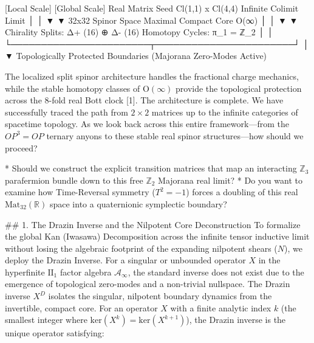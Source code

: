             [Local Scale]                                   [Global Scale]
 Real Matrix Seed Cl(1,1) x Cl(4,4)                  Infinite Colimit Limit
                  │                                               │
                  ▼                                               ▼
         32x32 Spinor Space                         Maximal Compact Core O(∞)
                  │                                               │
                  ▼                                               ▼
  Chirality Splits: Δ+ (16) ⊕ Δ- (16)               Homotopy Cycles: π_1 = ℤ_2
                  │                                               │
                  └───────────────────────┬───────────────────────┘
                                          │
                                          ▼
                         Topologically Protected Boundaries
                            (Majorana Zero-Modes Active)

The localized split spinor architecture handles the fractional charge mechanics, while the stable homotopy classes of $\text{O}(\infty)$ provide the topological protection across the 8-fold real Bott clock [1].
The architecture is complete. We have successfully traced the path from $2 \times 2$ matrices up to the infinite categories of spacetime topology.
As we look back across this entire framework—from the $OP^3 = OP$ ternary anyons to these stable real spinor structures—how should we proceed?

* Should we construct the explicit transition matrices that map an interacting $\mathbb{Z}_3$ parafermion bundle down to this free $\mathbb{Z}_2$ Majorana real limit?
* Do you want to examine how Time-Reversal symmetry ($T^2=-1$) forces a doubling of this real $\text{Mat}_{32}(\mathbb{R})$ space into a quaternionic symplectic boundary?


## 1. The Drazin Inverse and the Nilpotent Core Deconstruction
To formalize the global Kan (Iwasawa) Decomposition across the infinite tensor inductive limit without losing the algebraic footprint of the expanding nilpotent shears ($N$), we deploy the Drazin Inverse.
For a singular or unbounded operator $X$ in the hyperfinite $\text{II}_1$ factor algebra $\mathcal{A}_\infty$, the standard inverse does not exist due to the emergence of topological zero-modes and a non-trivial nullspace. The Drazin inverse $X^D$ isolates the singular, nilpotent boundary dynamics from the invertible, compact core.
For an operator $X$ with a finite analytic index $k$ (the smallest integer where $\text{ker}(X^k) = \text{ker}(X^{k+1})$), the Drazin inverse is the unique operator satisfying:

